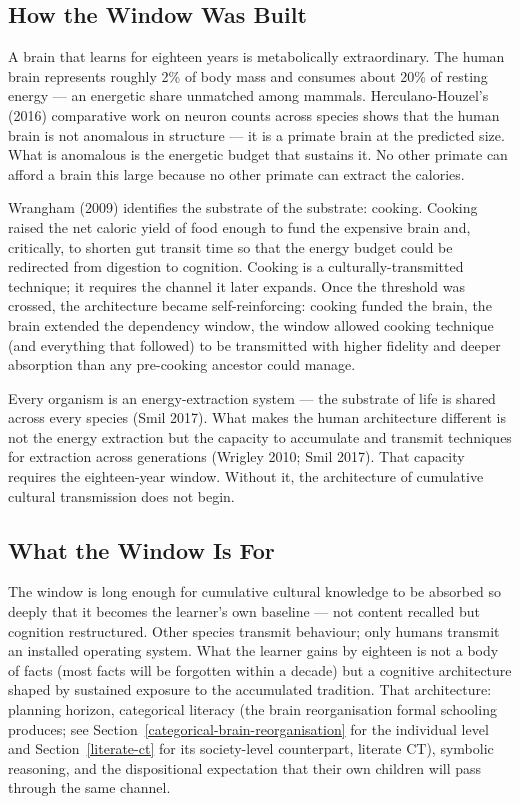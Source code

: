 \documentclass[12pt,letterpaper]{article}
\begin{document}
\subsection{How the Window Was Built}\label{how-the-window-was-built}

A brain that learns for eighteen years is metabolically extraordinary.
The human brain represents roughly 2\% of body mass and consumes
about 20\% of resting energy --- an energetic share unmatched among
mammals. Herculano-Houzel's (2016) comparative work on neuron counts
across species shows that the human brain is not anomalous in
structure --- it is a primate brain at the predicted size. What is
anomalous is the energetic budget that sustains it. No other primate
can afford a brain this large because no other primate can extract
the calories.

Wrangham (2009) identifies the substrate of the substrate: cooking.
Cooking raised the net caloric yield of food enough to fund the
expensive brain and, critically, to shorten gut transit time so that
the energy budget could be redirected from digestion to cognition.
Cooking is a culturally-transmitted technique; it requires the
channel it later expands. Once the threshold was crossed, the
architecture became self-reinforcing: cooking funded the brain, the
brain extended the dependency window, the window allowed cooking
technique (and everything that followed) to be transmitted with
higher fidelity and deeper absorption than any pre-cooking ancestor
could manage.

Every organism is an energy-extraction system --- the substrate of
life is shared across every species (Smil 2017). What makes the
human architecture different is not the energy extraction but the
capacity to accumulate and transmit techniques for extraction across
generations (Wrigley 2010; Smil 2017). That capacity requires the
eighteen-year window. Without it, the architecture of cumulative
cultural transmission does not begin.

\subsection{What the Window Is For}\label{what-the-window-is-for}

The window is long enough for cumulative cultural knowledge to be
absorbed so deeply that it becomes the learner's own baseline ---
not content recalled but cognition restructured. Other species
transmit behaviour; only humans transmit an installed operating
system. What the learner gains by eighteen is not a body of facts
(most facts will be forgotten within a decade) but a cognitive
architecture shaped by sustained exposure to the accumulated
tradition. That architecture: planning horizon, categorical literacy
(the brain reorganisation formal schooling produces; see
Section~\ref{categorical-brain-reorganisation} for the individual
level and Section~\ref{literate-ct} for its society-level
counterpart, literate CT), symbolic reasoning, and the dispositional
expectation that their own children will pass through the same
channel.
\end{document}
